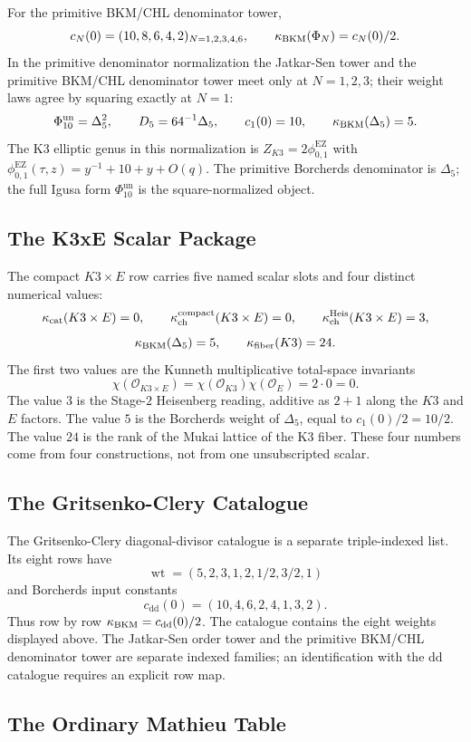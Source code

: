 For the primitive BKM/CHL denominator tower,
\[
  c_N(0)=(10,8,6,4,2)_{N=1,2,3,4,6},
  \qquad
  \kappa_{\mathrm{BKM}}(\Phi_N)=c_N(0)/2.
\]
In the primitive denominator normalization the Jatkar-Sen tower and the
primitive BKM/CHL denominator tower meet only at $N=1,2,3$; their
weight laws agree by squaring exactly at $N=1$:
\[
  \Phi_{10}^{\mathrm{un}}=\Delta_5^2,\qquad
  D_5=64^{-1}\Delta_5,\qquad
  c_1(0)=10,\qquad
  \kappa_{\mathrm{BKM}}(\Delta_5)=5.
\]
The K3 elliptic genus in this normalization is
$Z_{K3}=2\phi_{0,1}^{\mathrm{EZ}}$ with
$\phi_{0,1}^{\mathrm{EZ}}(\tau,z)=y^{-1}+10+y+O(q)$. The primitive
Borcherds denominator is $\Delta_5$; the full Igusa form
$\Phi_{10}^{\mathrm{un}}$ is the square-normalized object.

\subsection{The K3xE Scalar Package}

The compact $K3\times E$ row carries five named scalar slots and four
distinct numerical values:
\[
  \kappa_{\mathrm{cat}}(K3\times E)=0,\qquad
  \kappa_{\mathrm{ch}}^{\mathrm{compact}}(K3\times E)=0,\qquad
  \kappa_{\mathrm{ch}}^{\mathrm{Heis}}(K3\times E)=3,
\]
\[
  \kappa_{\mathrm{BKM}}(\Delta_5)=5,\qquad
  \kappa_{\mathrm{fiber}}(K3)=24.
\]
The first two values are the Kunneth multiplicative total-space
invariants
\[
  \chi(\mathcal O_{K3\times E})
  =
  \chi(\mathcal O_{K3})\chi(\mathcal O_E)
  =
  2\cdot0=0.
\]
The value $3$ is the Stage-$2$ Heisenberg reading, additive as
$2+1$ along the $K3$ and $E$ factors. The value $5$ is the
Borcherds weight of $\Delta_5$, equal to $c_1(0)/2=10/2$. The value
$24$ is the rank of the Mukai lattice of the K3 fiber. These four
numbers come from four constructions, not from one unsubscripted
scalar.

\subsection{The Gritsenko-Clery Catalogue}

The Gritsenko-Clery diagonal-divisor catalogue is a separate
triple-indexed list. Its eight rows have
\[
  \operatorname{wt}
  =
  (5,2,3,1,2,1/2,3/2,1)
\]
and Borcherds input constants
\[
  c_{\mathrm{dd}}(0)
  =
  (10,4,6,2,4,1,3,2).
\]
Thus row by row $\kappa_{\mathrm{BKM}}=c_{\mathrm{dd}}(0)/2$. The catalogue contains
the eight weights displayed above. The Jatkar-Sen order tower and the
primitive BKM/CHL denominator tower are separate indexed families; an
identification with the dd catalogue requires an explicit row map.

\subsection{The Ordinary Mathieu Table}

